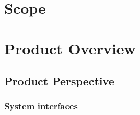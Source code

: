 \documentclass{scrreprt}
\begin{document}
\section{Scope}


\section{Product Overview}

\subsection{Product Perspective}


\subsubsection{System interfaces}
\end{document}
